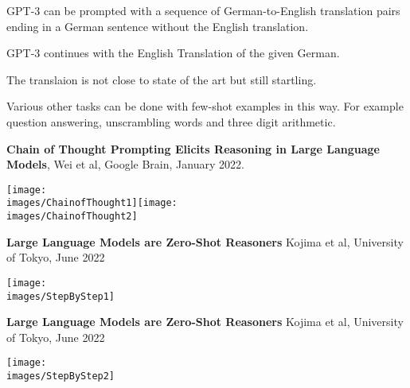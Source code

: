 {

GPT-3 can be prompted with a sequence of German-to-English translation pairs ending in a German sentence without the English translation.

\vfill
GPT-3 continues with the English Translation of the given German.

\vfill
The translaion is not close to state of the art but still startling.

\vfill
Various other tasks can be done with few-shot examples in this way.  For example question answering, unscrambling words and three digit arithmetic.


{\bf Chain of Thought Prompting Elicits Reasoning in Large Language Models}, Wei et al, Google Brain, January 2022.

\vfill
\centerline{\texttt{[image: \\images/ChainofThought1]}\texttt{[image: \\images/ChainofThought2]}}


{\bf Large Language Models are Zero-Shot Reasoners} Kojima et al, University of Tokyo, June 2022

\vfill

\centerline{\texttt{[image: \\images/StepByStep1]}}


{\bf Large Language Models are Zero-Shot Reasoners} Kojima et al, University of Tokyo, June 2022

\vfill
\centerline{\texttt{[image: \\images/StepByStep2]}}



}

